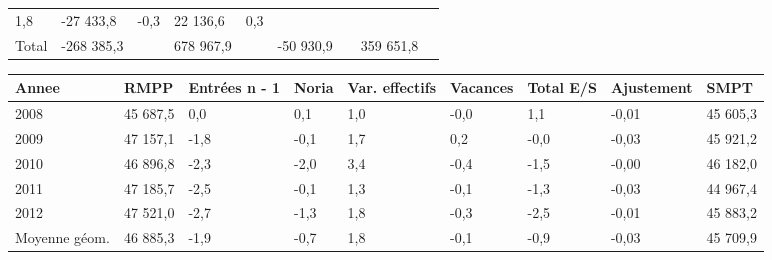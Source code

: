 \begin{longtable}[]{@{}lllllllll@{}}
\begin{minipage}[t]{0.06\columnwidth}
1,8\strut
\end{minipage} & \begin{minipage}[t]{0.12\columnwidth}\raggedright
-27 433,8\strut
\end{minipage} & \begin{minipage}[t]{0.06\columnwidth}\raggedright
-0,3\strut
\end{minipage} & \begin{minipage}[t]{0.08\columnwidth}\raggedright
22 136,6\strut
\end{minipage} & \begin{minipage}[t]{0.06\columnwidth}\raggedright
0,3\strut
\end{minipage}\tabularnewline
\begin{minipage}[t]{0.05\columnwidth}\raggedright
Total\strut
\end{minipage} & \begin{minipage}[t]{0.10\columnwidth}\raggedright
-268 385,3\strut
\end{minipage} & \begin{minipage}[t]{0.06\columnwidth}\raggedright
\strut
\end{minipage} & \begin{minipage}[t]{0.17\columnwidth}\raggedright
678 967,9\strut
\end{minipage} & \begin{minipage}[t]{0.06\columnwidth}\raggedright
\strut
\end{minipage} & \begin{minipage}[t]{0.12\columnwidth}\raggedright
-50 930,9\strut
\end{minipage} & \begin{minipage}[t]{0.06\columnwidth}\raggedright
\strut
\end{minipage} & \begin{minipage}[t]{0.08\columnwidth}\raggedright
359 651,8\strut
\end{minipage} & \begin{minipage}[t]{0.06\columnwidth}\raggedright
\strut
\end{minipage}\tabularnewline
\bottomrule
\end{longtable}

\begin{longtable}[]{@{}lllllllll@{}}
\toprule
Annee & RMPP & Entrées n - 1 & Noria & Var. effectifs & Vacances & Total
E/S & Ajustement & SMPT\tabularnewline
\midrule
\endhead
2008 & 45 687,5 & 0,0 & 0,1 & 1,0 & -0,0 & 1,1 & -0,01 & 45
605,3\tabularnewline
2009 & 47 157,1 & -1,8 & -0,1 & 1,7 & 0,2 & -0,0 & -0,03 & 45
921,2\tabularnewline
2010 & 46 896,8 & -2,3 & -2,0 & 3,4 & -0,4 & -1,5 & -0,00 & 46
182,0\tabularnewline
2011 & 47 185,7 & -2,5 & -0,1 & 1,3 & -0,1 & -1,3 & -0,03 & 44
967,4\tabularnewline
2012 & 47 521,0 & -2,7 & -1,3 & 1,8 & -0,3 & -2,5 & -0,01 & 45
883,2\tabularnewline
Moyenne géom. & 46 885,3 & -1,9 & -0,7 & 1,8 & -0,1 & -0,9 & -0,03 & 45
709,9\tabularnewline
\bottomrule
\end{longtable}

